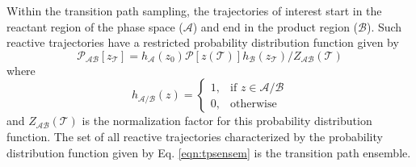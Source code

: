 \documentclass[journal=jpcbfk,manuscript=article,layout=traditional]{achemso}
\begin{document}
Within the transition path sampling, the trajectories of interest start in the reactant region of the 
phase space ($\mathcal{A}$) and end in the product region ($\mathcal{B}$). Such reactive trajectories have 
a restricted probability distribution function given by
\begin{equation}
\mathcal{P}_{\mathcal{AB}}[z_{\mathcal{T}}] = h_{\mathcal{A}}(z_0)\mathcal{P}[z(\mathcal{T})]
h_{\mathcal{B}}(z_{\mathcal{T}})/Z_{\mathcal{AB}}(\mathcal{T})\label{eqn:tpsensem}
\end{equation}
where 
\[
    h_{\mathcal{A}/\mathcal{B}}(z)= 
\begin{cases}
    1, & \text{if } z\in \mathcal{A}/\mathcal{B}\\
    0,              & \text{otherwise}
\end{cases}
\]
and $Z_{\mathcal{AB}}(\mathcal{T})$ is the normalization factor for this 
probability distribution function.
The set of all reactive trajectories characterized by the probability 
distribution function given by Eq. \ref{eqn:tpsensem} is the 
transition path ensemble. 
\end{document}
